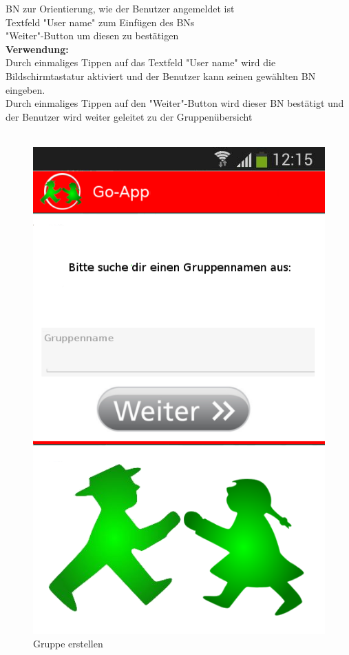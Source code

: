 BN zur Orientierung, wie der Benutzer angemeldet ist\\
Textfeld "User name" zum Einfügen des BNs\\
"Weiter"-Button um diesen zu bestätigen\\
\textbf{Verwendung:}\\
Durch einmaliges Tippen auf das Textfeld "User name" wird die Bildschirmtastatur aktiviert und der Benutzer kann seinen gewählten BN eingeben.\\
Durch einmaliges Tippen auf den "Weiter"-Button wird dieser BN bestätigt und der Benutzer wird weiter geleitet zu der Gruppenübersicht\\ \\

\begin{figure}[H]
	\caption{Gruppe erstellen}
\begin{center}
	\includegraphics[scale =0.5]{resources/images/gruppe_erstellen.png}
\end{center}
\end{figure}
